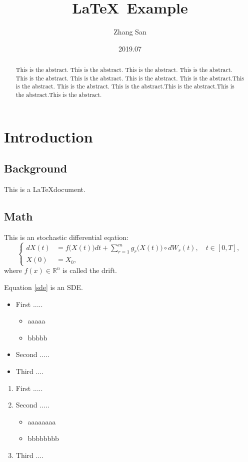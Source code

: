 \documentclass{article}
\title{\LaTeX \, Example}
\author{Zhang San}
\date{2019.07}
\begin{document}
\maketitle

\begin{abstract}
This is the abstract. This is the abstract. This is the abstract. This is the abstract. This is the abstract. This is the abstract. This is the abstract. This is the abstract.This is the abstract. This is the abstract. This is the abstract.This is the abstract.This is the abstract.This is the abstract.
\end{abstract}


\section{Introduction} 

\subsection{Background}

This is a \LaTeX document.


\subsection{Math}

This is an stochastic differential eqation: 
\begin{equation}\label{sde}
\left\{
\begin{aligned}
	dX(t) &= f\big(X(t)\big)dt + \sum_{r=1}^m g_r\big(X(t)\big) \circ dW_r(t), \quad t\in [0, T],\\
	X(0) &= X_0,
\end{aligned}\right.
\end{equation}
where $f(x) \in \mathbb{R}^n$ is called the drift.

Equation \ref{sde} is an SDE.


\begin{itemize}
	\item First .....
	\begin{itemize}
		\item aaaaa
		\item bbbbb
	\end{itemize}
	\item Second .....
	\item Third ....
\end{itemize}

\begin{enumerate}
	\item First .....
	\item Second .....
	\begin{itemize}
		\item aaaaaaaa
		\item bbbbbbbb
	\end{itemize}
	\item Third ....
\end{enumerate}
\end{document}
